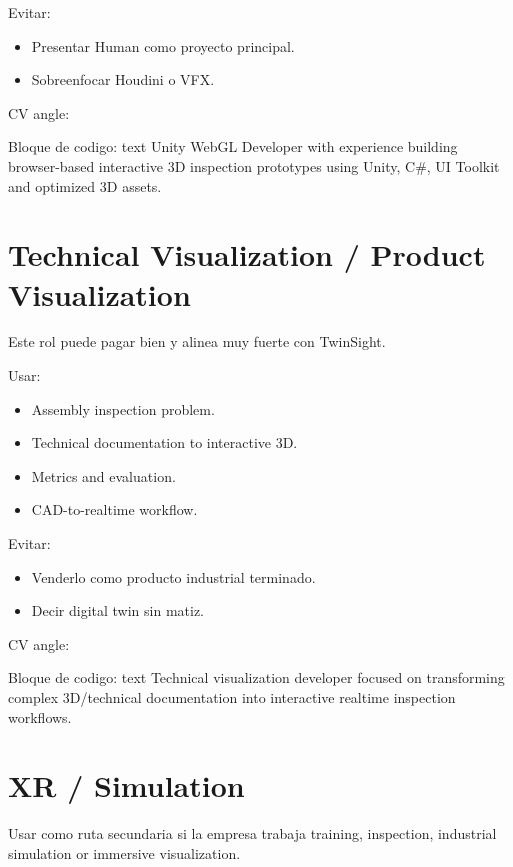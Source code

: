 Evitar:


\begin{itemize}
\item Presentar Human como proyecto principal.
\item Sobreenfocar Houdini o VFX.
\end{itemize}


CV angle:


\begin{mdcode}
Bloque de codigo: text
Unity WebGL Developer with experience building browser-based interactive 3D inspection prototypes using Unity, C#, UI Toolkit and optimized 3D assets.
\end{mdcode}


\section{Technical Visualization / Product Visualization}


Este rol puede pagar bien y alinea muy fuerte con TwinSight.


Usar:


\begin{itemize}
\item Assembly inspection problem.
\item Technical documentation to interactive 3D.
\item Metrics and evaluation.
\item CAD-to-realtime workflow.
\end{itemize}


Evitar:


\begin{itemize}
\item Venderlo como producto industrial terminado.
\item Decir digital twin sin matiz.
\end{itemize}


CV angle:


\begin{mdcode}
Bloque de codigo: text
Technical visualization developer focused on transforming complex 3D/technical documentation into interactive realtime inspection workflows.
\end{mdcode}


\section{XR / Simulation}


Usar como ruta secundaria si la empresa trabaja training, inspection, industrial simulation or immersive visualization.


